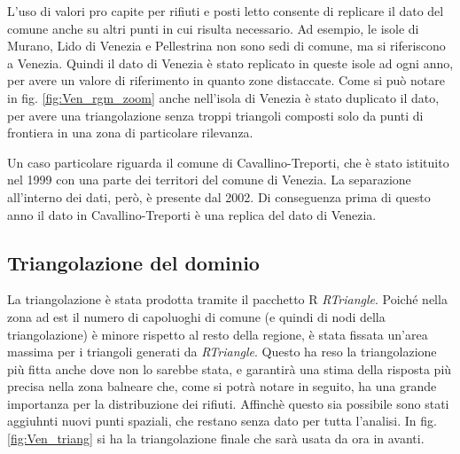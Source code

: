 \documentclass[a4paper,11pt,twoside,openright]{book}							%
\begin{document}
L'uso di valori pro capite per rifiuti e posti letto consente di replicare il dato del comune anche su altri punti in cui risulta necessario. Ad esempio, le isole di Murano, Lido di Venezia e Pellestrina non sono sedi di comune, ma si riferiscono a Venezia. Quindi il dato di Venezia è stato replicato in queste isole ad ogni anno, per avere un valore di riferimento in quanto zone distaccate. Come si può notare in fig. \ref{fig:Ven_rgm_zoom} anche nell'isola di Venezia è stato duplicato il dato, per avere una triangolazione  senza troppi triangoli composti solo da punti di frontiera in una zona di particolare rilevanza.

Un caso particolare riguarda il comune di Cavallino-Treporti, che è stato istituito nel 1999 con una parte dei territori del comune di Venezia. La separazione all'interno dei dati, però, è presente dal 2002. Di conseguenza prima di questo anno il dato in Cavallino-Treporti è una replica del dato di Venezia.

\subsection{Triangolazione del dominio}

La triangolazione è stata prodotta tramite il pacchetto R \textit{RTriangle}. Poiché nella zona ad est il numero di capoluoghi di comune (e quindi di nodi della triangolazione) è minore rispetto al resto della regione, è stata fissata un'area massima per i triangoli generati da \textit{RTriangle}. Questo ha reso la triangolazione più fitta anche dove non lo sarebbe stata, e garantirà una stima della risposta più precisa nella zona balneare che, come si potrà notare in seguito, ha una grande importanza per la distribuzione dei rifiuti. Affinchè questo sia possibile sono stati aggiuhnti nuovi punti spaziali, che restano senza dato per tutta l'analisi. In fig. \ref{fig:Ven_triang} si ha la triangolazione finale che sarà usata da ora in avanti.
\end{document}
